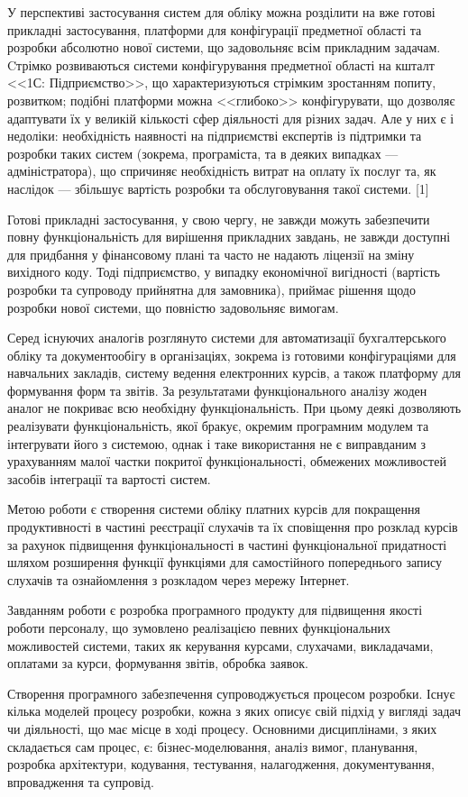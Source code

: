 \begin{sloppy}
У перспективі застосування систем для обліку можна розділити на вже готові прикладні застосування, платформи для конфігурації предметної області та розробки абсолютно нової системи, що задовольняє всім прикладним задачам. Cтрімко розвиваються системи конфігурування предметної області на кшталт <<1С: Підприємство>>, що характеризуються стрімким зростанням попиту, розвитком; подібні платформи можна <<глибоко>> конфігурувати, що дозволяє адаптувати їх у великій кількості сфер діяльності для різних задач. Але у них є і недоліки: необхідність наявності на підприємстві експертів із підтримки та розробки таких систем (зокрема, програміста, та в деяких випадках --- адміністратора), що спричиняє необхідність витрат на оплату їх послуг та, як наслідок --- збільшує вартість розробки та обслуговування такої системи. [1]

Готові прикладні застосування, у свою чергу, не завжди можуть забезпечити повну функціональність для вирішення прикладних завдань, не завжди доступні для придбання у фінансовому плані та часто не надають ліцензії на зміну вихідного коду. Тоді підприємство, у випадку економічної вигідності (вартість розробки та супроводу прийнятна для замовника), приймає рішення щодо розробки нової системи, що повністю задовольняє вимогам.

Серед існуючих аналогів розглянуто системи для автоматизації бухгалтерського обліку та документообігу в організаціях, зокрема із готовими конфігураціями для навчальних закладів, систему ведення електронних курсів, а також платформу для формування форм та звітів. За результатами функціонального аналізу жоден аналог не покриває всю необхідну функціональність. При цьому деякі дозволяють реалізувати функціональність, якої бракує, окремим програмним модулем та інтегрувати його з системою, однак і таке використання не є виправданим з урахуванням малої частки покритої функціональності, обмежених можливостей засобів інтеграції та вартості систем.

Метою роботи є створення системи обліку платних курсів для покращення продуктивності в частині реєстрації слухачів та їх сповіщення про розклад курсів за рахунок підвищення функціональності в частині функціональної придатності шляхом розширення функції функціями для самостійного попереднього запису слухачів та ознайомлення з розкладом через мережу Інтернет.

Завданням роботи є розробка програмного продукту для підвищення якості роботи персоналу, що зумовлено реалізацією певних функціональних можливостей системи, таких як керування курсами, слухачами, викладачами, оплатами за курси, формування звітів, обробка заявок.

Створення програмного забезпечення супроводжується процесом розробки. Існує кілька моделей процесу розробки, кожна з яких описує свій підхід у вигляді задач чи діяльності, що має місце в ході процесу. Основними дисциплінами, з яких складається сам процес, є: бізнес-моделювання, аналіз вимог, планування, розробка архітектури, кодування, тестування, налагодження, документування, впровадження та супровід.
\end{sloppy}
